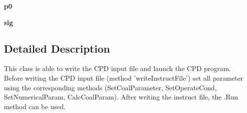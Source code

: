\begin{DoxyCompactItemize}
\item 
\hypertarget{classCPD__SetAndLaunch_1_1SetterAndLauncher_adfa8dd137a5acabafdd566232e11db36}{{\bfseries p0}}\label{classCPD__SetAndLaunch_1_1SetterAndLauncher_adfa8dd137a5acabafdd566232e11db36}

\item 
\hypertarget{classCPD__SetAndLaunch_1_1SetterAndLauncher_a3984ed90521f966c0e16362b67ef88ab}{{\bfseries sig}}\label{classCPD__SetAndLaunch_1_1SetterAndLauncher_a3984ed90521f966c0e16362b67ef88ab}

\end{DoxyCompactItemize}


\subsection{\-Detailed \-Description}
\begin{DoxyVerb}This class is able to write the CPD input file and launch the CPD program. Before writing the CPD input file (method 'writeInstructFile') set all parameter using the corresponding methods (SetCoalParameter, SetOperateCond, SetNumericalParam, CalcCoalParam). After writing the instruct file, the .Run method can be used.\end{DoxyVerb}
 

